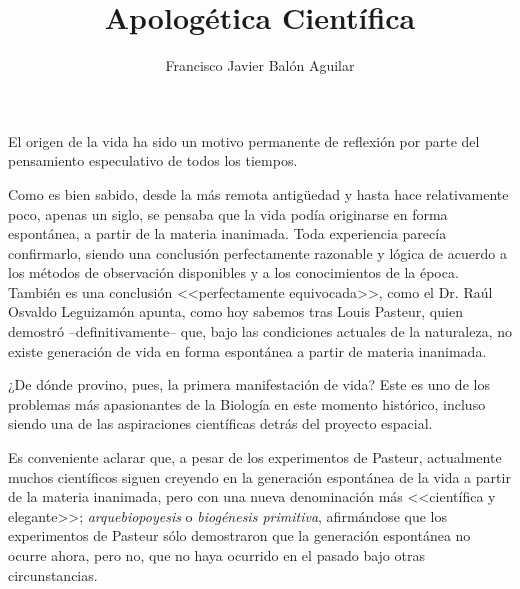 \documentclass[11pt, oneside, titlepage]{article}
\title{\textbf{Apologética Científica}}
\author{Francisco Javier Balón Aguilar}
\begin{document}
\maketitle
\tableofcontents
\newpage


    El origen de la vida ha sido un motivo permanente de reflexión por parte del pensamiento especulativo 
    de todos los tiempos.
    
    Como es bien sabido, desde la más remota antigüedad y hasta hace relativamente poco, apenas un siglo, 
    se pensaba que la vida podía originarse en forma espontánea, a partir de la materia inanimada. Toda 
    experiencia parecía confirmarlo, siendo una conclusión perfectamente razonable y lógica de acuerdo a 
    los métodos de observación disponibles y a los conocimientos de la época. También es una conclusión 
    <<perfectamente equivocada>>, como el Dr. Raúl Osvaldo Leguizamón apunta, como hoy sabemos tras Louis 
    Pasteur, quien demostró --definitivamente-- que, bajo las condiciones actuales de la naturaleza, no 
    existe generación de vida en forma espontánea a partir de materia inanimada.

    ¿De dónde provino, pues, la primera manifestación de vida? Este es uno de los problemas más apasionantes 
    de la Biología en este momento histórico, incluso siendo una de las aspiraciones científicas detrás del 
    proyecto espacial.

    Es conveniente aclarar que, a pesar de los experimentos de Pasteur, actualmente muchos científicos
    siguen creyendo en la generación espontánea de la vida a partir de la materia inanimada, pero con una 
    nueva denominación más <<científica y elegante>>; \textit{arquebiopoyesis} o \textit{biogénesis primitiva}, 
    afirmándose que los experimentos de Pasteur sólo demostraron que la generación espontánea no ocurre ahora,
    pero no, que no haya ocurrido en el pasado bajo otras circunstancias.



\end{document}
